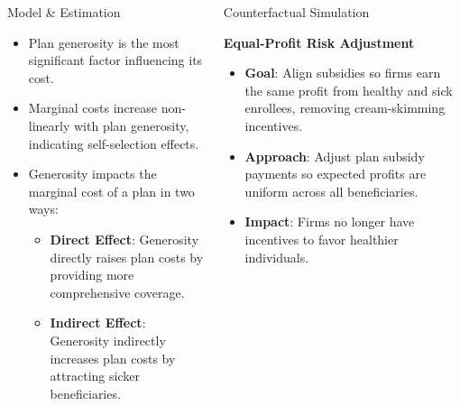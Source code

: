 \documentclass{beamer}
\begin{document}
\begin{frame}[t]
\begin{columns}[t]
\begin{column}{.3\textwidth}
\begin{block}{Model \& Estimation}
      
      \begin{itemize}
        \item Plan generosity is the most significant factor influencing its cost.
        \item Marginal costs increase non-linearly with plan generosity, indicating self-selection effects.
        \item Generosity impacts the marginal cost of a plan in two ways:
          \begin{itemize}
            \item \textbf{Direct Effect}: Generosity directly raises plan costs by providing more comprehensive coverage.
            \item \textbf{Indirect Effect}: Generosity indirectly increases plan costs by attracting sicker beneficiaries.
          \end{itemize}
      \end{itemize}
      \end{block}

    \end{column}
    \begin{column}{.25 \textwidth}
      \begin{block}{Counterfactual Simulation}
        \begin{center}
          \textbf{Equal-Profit Risk Adjustment}
        \end{center}

        \begin{itemize}
          \item \textbf{Goal}: Align subsidies so firms earn the same profit from healthy and sick enrollees, removing cream-skimming incentives.
          \item \textbf{Approach}: Adjust plan subsidy payments so expected profits are uniform across all beneficiaries.
          \item \textbf{Impact}: Firms no longer have incentives to favor healthier individuals. 
        \end{itemize}
        

\end{block}
\end{column}
\end{columns}
\end{frame}
\end{document}
